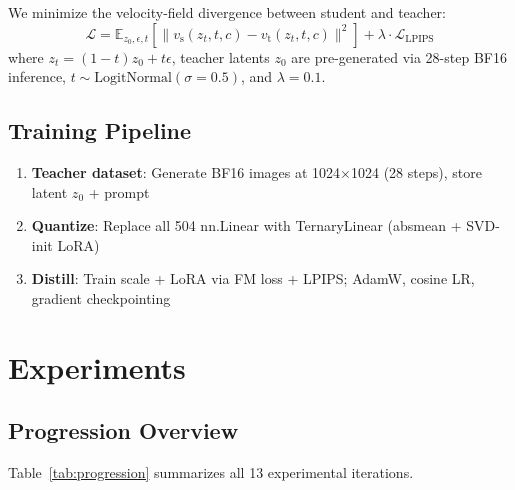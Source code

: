 \documentclass[11pt]{article}
\begin{document}
We minimize the velocity-field divergence between student and teacher:
\begin{equation}
  \mathcal{L} = \mathbb{E}_{z_0, \epsilon, t} \left[ \| v_\text{s}(z_t, t, c) - v_\text{t}(z_t, t, c) \|^2 \right] + \lambda \cdot \mathcal{L}_{\text{LPIPS}}
\end{equation}
where $z_t = (1-t)z_0 + t\epsilon$, teacher latents $z_0$ are pre-generated via 28-step BF16 inference, $t \sim \text{LogitNormal}(\sigma=0.5)$, and $\lambda = 0.1$.

\subsection{Training Pipeline}

\begin{enumerate}[nosep,leftmargin=1.5em]
  \item \textbf{Teacher dataset}: Generate BF16 images at 1024$\times$1024 (28 steps), store latent $z_0$ + prompt
  \item \textbf{Quantize}: Replace all 504 nn.Linear with TernaryLinear (absmean + SVD-init LoRA)
  \item \textbf{Distill}: Train scale + LoRA via FM loss + LPIPS; AdamW, cosine LR, gradient checkpointing
\end{enumerate}

\section{Experiments}

\subsection{Progression Overview}

Table~\ref{tab:progression} summarizes all 13 experimental iterations.
\end{document}
